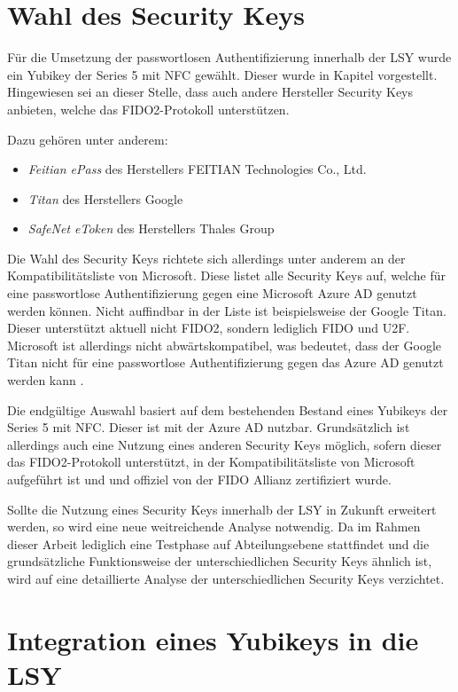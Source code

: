 \section{Wahl des Security Keys} \label{secwahl}
Für die Umsetzung der passwortlosen Authentifizierung innerhalb der \ac{LSY} wurde ein Yubikey der Series 5 mit NFC gewählt. Dieser wurde in Kapitel vorgestellt. Hingewiesen sei an dieser Stelle, dass auch andere Hersteller Security Keys anbieten, welche das FIDO2-Protokoll unterstützen. 

Dazu gehören unter anderem:
\begin{itemize}
    \item \textit{Feitian ePass} des Herstellers FEITIAN Technologies Co., Ltd.
    \item \textit{Titan} des Herstellers Google
    \item \textit{SafeNet eToken} des Herstellers Thales Group
\end{itemize}

Die Wahl des Security Keys richtete sich allerdings unter anderem an der Kompatibilitätsliste \cite{compWin} von Microsoft. Diese listet alle Security Keys auf, welche für eine passwortlose Authentifizierung gegen eine Microsoft Azure \ac{AD} genutzt werden können. Nicht auffindbar in der Liste ist beispielsweise der Google Titan. Dieser unterstützt aktuell nicht FIDO2, sondern lediglich FIDO und \ac{U2F}. Microsoft ist allerdings nicht abwärtskompatibel, was bedeutet, dass der Google Titan nicht für eine passwortlose Authentifizierung gegen das Azure \ac{AD} genutzt werden kann .

Die endgültige Auswahl basiert auf dem bestehenden Bestand eines Yubikeys der Series 5 mit NFC. Dieser ist mit der Azure \ac{AD} nutzbar. Grundsätzlich ist allerdings auch eine Nutzung eines anderen Security Keys möglich, sofern dieser das \ac{FIDO}2-Protokoll unterstützt, in der Kompatibilitätsliste von Microsoft aufgeführt ist und und offiziel von der \ac{FIDO} Allianz zertifiziert wurde.

Sollte die Nutzung eines Security Keys innerhalb der \ac{LSY} in Zukunft erweitert werden, so wird eine neue weitreichende Analyse notwendig. Da im Rahmen dieser Arbeit lediglich eine Testphase auf Abteilungsebene stattfindet und die grundsätzliche Funktionsweise der unterschiedlichen Security Keys ähnlich ist, wird auf eine detaillierte Analyse der unterschiedlichen Security Keys verzichtet.

\section{Integration eines Yubikeys in die LSY}

